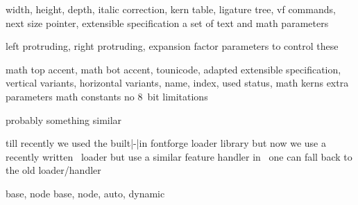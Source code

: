 
\startdocument
  [title={OPENTYPE FONTS},
   subtitle={the generic loader},
   location={Hans Hagen \endash\ bacho\TeX\ 2016}]

\starttitle[title={how engines sees a font}]

\startsubject[title={\TeX}]

     width, height, depth, italic correction, kern table,
    ligature tree, vf commands, next size pointer, extensible specification
     a set of text and math parameters

\stopsubject

\startsubject[title={\pdfTeX}]

     left protruding, right protruding, expansion
    factor  parameters to control these

\stopsubject

\startsubject[title={\LuaTeX}]

     math top accent, math bot accent, tounicode,
    adapted extensible specification, vertical variants, horizontal variants,
    name, index, used status, math kerns  extra parameters
     math constants  no 8~bit
    limitations

\stopsubject

\startsubject[title={\XeTeX}]

    probably something similar

\stopsubject

\stoptitle

\starttitle[title={font handling}]

\startsubject[title={loading opentype font data}]

    \startitemize
        \startitem
            till recently we used the built|-|in fontforge loader library
        \stopitem
        \startitem
            but now we use a recently written \Lua\ loader
        \stopitem
        \startitem
            but use a similar feature handler
        \stopitem
        \startitem
            in \ConTeXt\ one can fall back to the old loader/handler
        \stopitem
    \stopitemize

\stopsubject

\startsubject[title={applying (opentype) features}]

     base, node \crlf
     base, node, auto, dynamic

